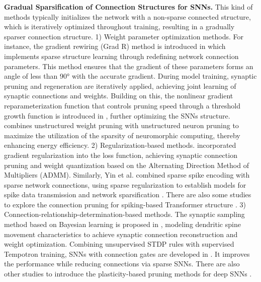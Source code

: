 \textbf{Gradual Sparsification of Connection Structures for SNNs.} This kind of methods typically initializes the network with a non-sparse connected structure, which is iteratively optimized throughout training, resulting in a gradually sparser connection structure.
1) Weight parameter optimization methods. For instance, the gradient rewiring (Grad R) method is introduced in  \citep{chen2021pruning} which implements sparse structure learning through redefining network connection parameters. This method ensures that the gradient of these parameters forms an angle of less than 90° with the accurate gradient. During model training, synaptic pruning and regeneration are iteratively applied, achieving joint learning of synaptic connections and weights. Building on this, the nonlinear gradient reparameterization function that controls pruning speed through a threshold growth function is introduced in \citep{chen2022state}, further optimizing the SNNs structure. \citep{shi2023towards} combines unstructured weight pruning with unstructured neuron
pruning to maximize the utilization of the sparsity of neuromorphic computing,
thereby enhancing energy efficiency. 
2) Regularization-based methods. \citep{deng2021comprehensive} incorporated gradient regularization into the loss function, achieving synaptic connection pruning and weight quantization based on the Alternating Direction Method of Multipliers (ADMM). Similarly, Yin et al. combined sparse spike encoding with sparse network connections, using sparse regularization to establish models for spike data transmission and network sparsification \citep{yin2021energy}. There are also some studies to explore the connection pruning for spiking-based Transformer structure \citep{liu2024sparsespikformer}.
3) Connection-relationship-determination-based methods.
The synaptic sampling method based on Bayesian learning is proposed in \citep{kappel2015network}, modeling dendritic spine movement characteristics to achieve synaptic connection reconstruction and weight optimization. Combining unsupervised STDP rules with supervised Tempotron training, SNNs with connection gates are developed in \citep{qi2018jointly}. It improves the performance while reducing connections via sparse SNNs. There are also other studies to introduce the plasticity-based pruning methods for deep SNNs \citep{han2024developmental}.


